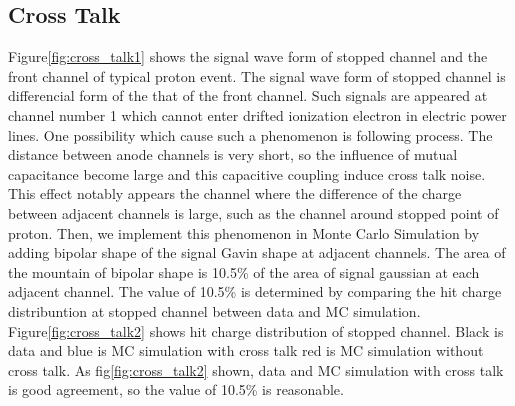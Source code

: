 \subsection{Cross Talk}

Figure\ref{fig:cross_talk1} shows the signal wave form of stopped channel and the front channel of typical proton event.
The signal wave form of stopped channel is differencial form of the that of the front channel.
Such signals are appeared at channel number 1 which cannot enter drifted ionization electron in electric power lines.
One possibility which cause such a phenomenon is following process.
The distance between anode channels is very short,
so the influence of mutual capacitance become large
and this capacitive coupling induce cross talk noise.
This effect notably appears the channel where the difference of the charge between adjacent channels is large,
such as the channel around stopped point of proton.
Then, we implement this phenomenon in Monte Carlo Simulation
by adding bipolar shape of the signal Gavin shape at adjacent channels.
The area of the mountain of bipolar shape is 10.5\% of the area of signal gaussian at each adjacent channel.
The value of 10.5\% is determined by comparing the hit charge distribuntion at stopped channel between data and MC simulation.
Figure\ref{fig:cross_talk2} shows hit charge distribution of stopped channel.
Black is data and blue is MC simulation with cross talk red is MC simulation without cross talk.
As fig\ref{fig:cross_talk2} shown, data and MC simulation with cross talk is good agreement,
so the value of 10.5\% is reasonable.

